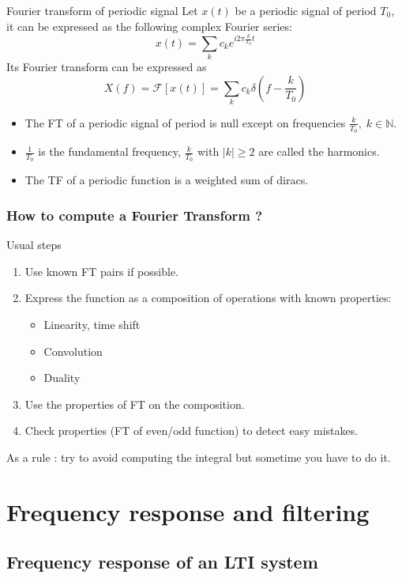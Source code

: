 \begin{block}{Fourier transform of periodic signal}
    Let $x(t)$ be a periodic signal of period $T_0$, it can be expressed as the following complex Fourier series:
    $$x(t)= \sum_k c_k e^{i 2 \pi \frac{k}{T_0}t} $$
    Its Fourier transform can be expressed as 
    $$
  X(f)=\mathcal{F}[x(t)]= %
  \sum_k c_k \delta\left(f-\frac{k}{T_0}\right)
    $$
    \begin{itemize}
      \item The FT of a periodic signal of period is null except on frequencies $\frac{k}{T_0},\;k\in\mathbb{N}$.
      \item $\frac{1}{T_0}$ is the fundamental frequency, $\frac{k}{T_0}$ with $|k|\geq 2$ are called the harmonics.
      \item The TF of a periodic function is a weighted sum of diracs.
      \end{itemize}
  \end{block}


  \frametitle{How to compute a Fourier Transform ?}

  \begin{block}{Usual steps}
    \begin{enumerate}
      \item Use known FT pairs if possible.
      \item Express the function as a composition of operations with known properties:
        \begin{itemize}
          \item Linearity, time shift
          \item Convolution
          \item Duality
        \end{itemize}
      \item Use the properties of FT on the composition.
      \item Check properties (FT of even/odd function) to detect easy mistakes.
    \end{enumerate}
    As a rule : try to avoid computing the integral but sometime you have to do it.
  \end{block}

   

\section{Frequency response and filtering}
\label{sec:freq-response}

\subsection{Frequency response of an LTI system}
\label{sec:}

